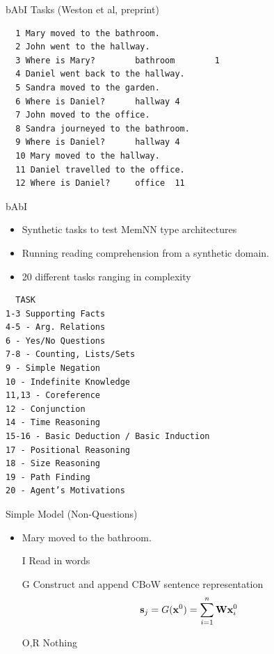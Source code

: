 \documentclass{beamer}
\begin{document}
\begin{frame}[fragile]{bAbI Tasks (Weston et al, preprint) }
\begin{verbatim}
  1 Mary moved to the bathroom.
  2 John went to the hallway.
  3 Where is Mary?        bathroom        1
  4 Daniel went back to the hallway.
  5 Sandra moved to the garden.
  6 Where is Daniel?      hallway 4
  7 John moved to the office.
  8 Sandra journeyed to the bathroom.
  9 Where is Daniel?      hallway 4
  10 Mary moved to the hallway.
  11 Daniel travelled to the office.
  12 Where is Daniel?     office  11
\end{verbatim}
\end{frame}

\begin{frame}{bAbI}
  \begin{itemize}
  \item Synthetic tasks to test MemNN type architectures
    \air
  \item Running reading comprehension from a synthetic domain.
    \air 
  \item 20 different tasks ranging in complexity
  \end{itemize}
\end{frame}

\begin{frame}[fragile]
\begin{verbatim}
  TASK
1-3 Supporting Facts
4-5 - Arg. Relations
6 - Yes/No Questions
7-8 - Counting, Lists/Sets
9 - Simple Negation
10 - Indefinite Knowledge
11,13 - Coreference
12 - Conjunction
14 - Time Reasoning
15-16 - Basic Deduction / Basic Induction
17 - Positional Reasoning
18 - Size Reasoning
19 - Path Finding
20 - Agent’s Motivations
\end{verbatim}
\end{frame}

\begin{frame}{Simple Model (Non-Questions)}
  \begin{itemize}
  \item Mary moved to the bathroom.
  \end{itemize}

  \begin{itemize}
  \item[I] Read in words
  \item[G] Construct and append CBoW sentence representation 
    \[\mathbf{s}_j =  G(\mathbf{x}^0) =  \sum_{i=1}^n \mathbf{W} \mathbf{x}^0_i\]
  \item[O,R] Nothing  
  \end{itemize}
\end{frame}
\end{document}
